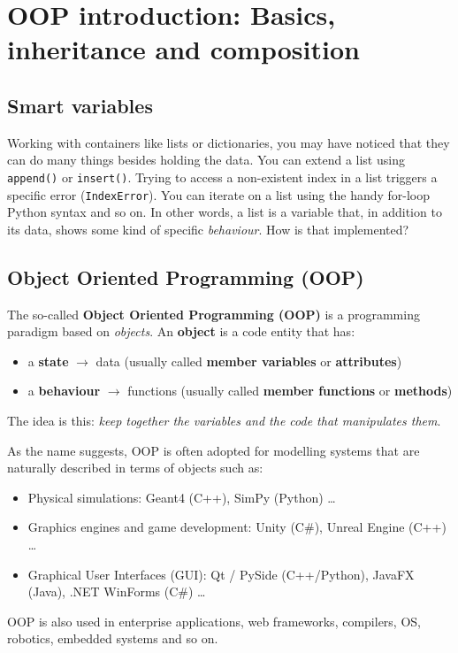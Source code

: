 \section{OOP introduction: Basics, inheritance and composition}

\subsection{Smart variables}
Working with containers like lists or dictionaries, you may have noticed that they can do many things besides holding the data. You can extend a list using \texttt{append()} or \texttt{insert()}. Trying to access a non-existent index in a list triggers a specific error (\texttt{IndexError}). You can iterate on a list using the handy for-loop Python syntax and so on. In other words, a list is a variable that, in addition to its data, shows some kind of specific \textit{behaviour}. How is that implemented?

\subsection{Object Oriented Programming (OOP)}
The so-called \textbf{Object Oriented Programming (OOP)} is a programming paradigm based on \textit{objects}. An \textbf{object} is a code entity that has:
\begin{itemize}
    \item[-] a \textbf{state} $\rightarrow$ data (usually called \textbf{member variables} or \textbf{attributes})
    \item[-] a \textbf{behaviour} $\rightarrow$ functions (usually called \textbf{member functions} or \textbf{methods})
\end{itemize}

The idea is this: \textit{keep together the variables and the code that manipulates them}. 

As the name suggests, OOP is often adopted for modelling systems that are naturally described in terms of objects such as:
\begin{itemize}
    \item[-] Physical simulations: Geant4 (C++), SimPy (Python) \ldots
    \item[-] Graphics engines and game development: Unity (C\#), Unreal Engine (C++) \ldots
    \item[-] Graphical User Interfaces (GUI): Qt / PySide (C++/Python), JavaFX (Java), .NET WinForms (C\#) \ldots
\end{itemize}
OOP is also used in enterprise applications, web frameworks, compilers, OS, robotics, embedded systems and so on.

